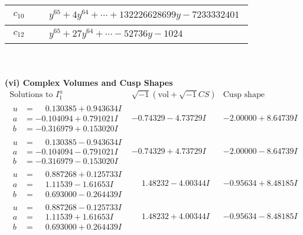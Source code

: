 \documentclass[1p]{elsarticle_modified}
\theoremstyle{definition}
\newcommand{\I}{\sqrt{-1}}
\begin{document}
\begin{tabular}{m{50pt}|m{274pt}}
\hline $$\begin{aligned}c_{10}\end{aligned}$$&$\begin{aligned}
&y^{65}+4 y^{64}+\cdots+132226628699 y-7233332401
\end{aligned}$\\
\hline $$\begin{aligned}c_{12}\end{aligned}$$&$\begin{aligned}
&y^{65}+27 y^{64}+\cdots-52736 y-1024
\end{aligned}$\\
\hline
\end{tabular}\\~\\
\newpage\flushleft \textbf{(vi) Complex Volumes and Cusp Shapes}
$$\begin{array}{c|c|c}  
\text{Solutions to }I^u_{1}& \I (\text{vol} + \sqrt{-1}CS) & \text{Cusp shape}\\
 \hline 
\begin{aligned}
u &= \phantom{-}0.130385 + 0.943634 I \\
a &= -0.104094 + 0.791021 I \\
b &= -0.316979 + 0.153020 I\end{aligned}
 & -0.74329 - 4.73729 I & -2.00000 + 8.64739 I \\ \hline\begin{aligned}
u &= \phantom{-}0.130385 - 0.943634 I \\
a &= -0.104094 - 0.791021 I \\
b &= -0.316979 - 0.153020 I\end{aligned}
 & -0.74329 + 4.73729 I & -2.00000 - 8.64739 I \\ \hline\begin{aligned}
u &= \phantom{-}0.887268 + 0.125733 I \\
a &= \phantom{-}1.11539 - 1.61653 I \\
b &= \phantom{-}0.693000 - 0.264439 I\end{aligned}
 & \phantom{-}1.48232 - 4.00344 I & -0.95634 + 8.48185 I \\ \hline\begin{aligned}
u &= \phantom{-}0.887268 - 0.125733 I \\
a &= \phantom{-}1.11539 + 1.61653 I \\
b &= \phantom{-}0.693000 + 0.264439 I\end{aligned}
 & \phantom{-}1.48232 + 4.00344 I & -0.95634 - 8.48185 I \\ \hline\begin{aligned}

\end{aligned}
\end{array}$$
\end{document}
